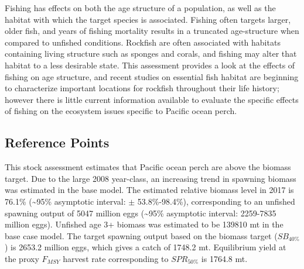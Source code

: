 \documentclass[12pt,]{article}
\begin{document}
Fishing has effects on both the age structure of a population, as well
as the habitat with which the target species is associated. Fishing
often targets larger, older fish, and years of fishing mortality results
in a truncated age-structure when compared to unfished conditions.
Rockfish are often associated with habitats containing living structure
such as sponges and corals, and fishing may alter that habitat to a less
desirable state. This assessment provides a look at the effects of
fishing on age structure, and recent studies on essential fish habitat
are beginning to characterize important locations for rockfish
throughout their life history; however there is little current
information available to evaluate the specific effects of fishing on the
ecosystem issues specific to Pacific ocean perch.

\subsection*{Reference Points}\label{reference-points}

This stock assessment estimates that Pacific ocean perch are above the
biomass target. Due to the large 2008 year-class, an increasing trend in
spawning biomass was estimated in the base model. The estimated relative
biomass level in 2017 is 76.1\% (\textasciitilde{}95\% asymptotic
interval: \(\pm\) 53.8\%-98.4\%), corresponding to an unfished spawning
output of 5047 million eggs (\textasciitilde{}95\% asymptotic interval:
2259-7835 million eggs). Unfished age 3+ biomass was estimated to be
139810 mt in the base case model. The target spawning output based on
the biomass target (\(SB_{40\%}\)) is 2653.2 million eggs, which gives a
catch of 1748.2 mt. Equilibrium yield at the proxy \(F_{MSY}\) harvest
rate corresponding to \(SPR_{50\%}\) is 1764.8 mt.
\end{document}
